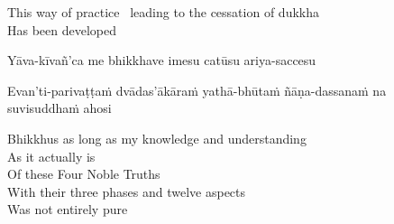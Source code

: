 \begin{english}
  This way of practice \breathmark\ leading to the cessation of dukkha\\
  Has been developed
\end{english}

\begin{pali-hang-first-line}
Yāva-kīvañ'ca me bhikkhave imesu catūsu ariya-saccesu
\end{pali-hang-first-line}
\begin{pali-hang-together}
  Evan'ti-parivaṭṭaṁ dvādas'ākāraṁ yathā-bhūtaṁ ñāṇa-dassanaṁ na suvisuddhaṁ ahosi
\end{pali-hang-together}

\begin{english-verses}
  Bhikkhus as long as \ifdigital\makeatletter\hyperlink{endnote158-appendix}\makeatother \thinspace\fi my knowledge and understanding\\
  As it actually is\\
  Of these Four Noble Truths\\
  With their three phases and twelve aspects\makeatletter\hyperlink{endnote57-appendix}\makeatother\\
  Was not entirely pure
\end{english-verses}

\ifbfive\clearpage\fi
\ifninebythirteen\clearpage\fi

